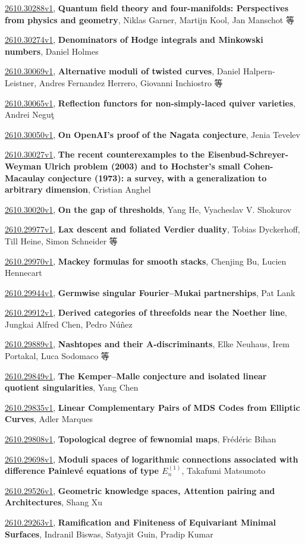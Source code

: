 \documentclass[9pt, a4paper]{article}
\theoremstyle{plain}
\theoremstyle{definition}
\theoremstyle{remark}
\newcommand{\arxiv}[3]{\href{https://arxiv.org/abs/#1}{#1}, \textbf{\textcolor{arxivblue}{#2}}, #3}
\begin{document}
\arxiv{2610.30288v1}{Quantum field theory and four-manifolds: Perspectives from physics and geometry}{Niklas Garner, Martijn Kool, Jan Manschot 等}

\arxiv{2610.30274v1}{Denominators of Hodge integrals and Minkowski numbers}{Daniel Holmes}

\arxiv{2610.30069v1}{Alternative moduli of twisted curves}{Daniel Halpern-Leistner, Andres Fernandez Herrero, Giovanni Inchiostro 等}

\arxiv{2610.30065v1}{Reflection functors for non-simply-laced quiver varieties}{Andrei Neguţ}

\arxiv{2610.30050v1}{On OpenAI's proof of the Nagata conjecture}{Jenia Tevelev}

\arxiv{2610.30027v1}{The recent counterexamples to the Eisenbud-Schreyer-Weyman Ulrich problem (2003) and to Hochster's small Cohen-Macaulay conjecture (1973): a survey, with a generalization to arbitrary dimension}{Cristian Anghel}

\arxiv{2610.30020v1}{On the gap of thresholds}{Yang He, Vyacheslav V. Shokurov}

\arxiv{2610.29977v1}{Lax descent and foliated Verdier duality}{Tobias Dyckerhoff, Till Heine, Simon Schneider 等}

\arxiv{2610.29970v1}{Mackey formulas for smooth stacks}{Chenjing Bu, Lucien Hennecart}

\arxiv{2610.29944v1}{Germwise singular Fourier--Mukai partnerships}{Pat Lank}

\arxiv{2610.29912v1}{Derived categories of threefolds near the Noether line}{Jungkai Alfred Chen, Pedro Núñez}

\arxiv{2610.29889v1}{Nashtopes and their A-discriminants}{Elke Neuhaus, Irem Portakal, Luca Sodomaco 等}

\arxiv{2610.29849v1}{The Kemper--Malle conjecture and isolated linear quotient singularities}{Yang Chen}

\arxiv{2610.29835v1}{Linear Complementary Pairs of MDS Codes from Elliptic Curves}{Adler Marques}

\arxiv{2610.29808v1}{Topological degree of fewnomial maps}{Frédéric Bihan}

\arxiv{2610.29698v1}{Moduli spaces of logarithmic connections associated with difference Painlevé equations of type $E^{(1)}_n$}{Takafumi Matsumoto}

\arxiv{2610.29526v1}{Geometric knowledge spaces, Attention pairing and Architectures}{Shang Xu}

\arxiv{2610.29263v1}{Ramification and Finiteness of Equivariant Minimal Surfaces}{Indranil Biswas, Satyajit Guin, Pradip Kumar}
\end{document}
